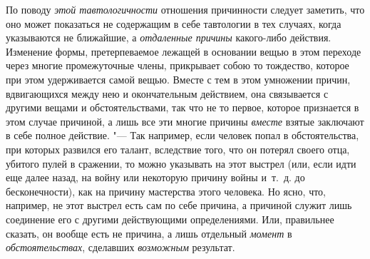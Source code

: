 По поводу {\em этой тавтологичности} отношения
причинности следует заметить, что оно может показаться не содержащим в себе
тавтологии в тех случаях, когда указываются не ближайшие, а
{\em отдаленные причины} какого-либо действия.
Изменение формы, претерпеваемое лежащей в основании вещью в этом переходе
через многие промежуточные члены, прикрывает собою то тождество, которое
при этом удерживается самой вещью. Вместе с тем в этом умножении причин,
вдвигающихся между нею и окончательным действием, она связывается с другими
вещами и обстоятельствами, так что не то первое, которое признается в этом
случае причиной, а лишь все эти многие причины
{\em вместе} взятые заключают в себе полное действие. "---
Так например, если человек попал в обстоятельства, при которых развился его
талант, вследствие того, что он потерял своего отца, убитого пулей в
сражении, то можно указывать на этот выстрел (или, если идти еще далее
назад, на войну или некоторую причину войны и~т.~д. до бесконечности), как
на причину мастерства этого человека. Но ясно, что, например, не этот
выстрел есть сам по себе причина, а причиной служит лишь соединение его с
другими действующими определениями. Или, правильнее сказать, он вообще есть
не причина, а лишь отдельный {\em момент} в
{\em обстоятельствах}, сделавших
{\em возможным} результат.

